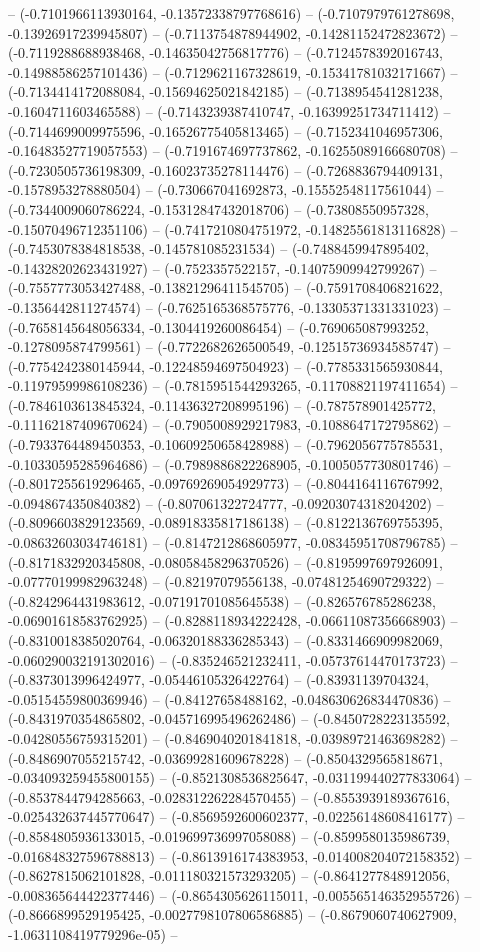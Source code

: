 -- (-0.7101966113930164, -0.13572338797768616) -- (-0.7107979761278698, -0.13926917239945807) -- (-0.7113754878944902, -0.14281152472823672) -- (-0.7119288688938468, -0.14635042756817776) -- (-0.7124578392016743, -0.14988586257101436) -- (-0.7129621167328619, -0.15341781032171667) -- (-0.7134414172088084, -0.15694625021842185) -- (-0.7138954541281238, -0.1604711603465588) -- (-0.7143239387410747, -0.16399251734711412) -- (-0.7144699009975596, -0.16526775405813465) -- (-0.7152341046957306, -0.16483527719057553) -- (-0.7191674697737862, -0.16255089166680708) -- (-0.7230505736198309, -0.16023735278114476) -- (-0.7268836794409131, -0.1578953278880504) -- (-0.730667041692873, -0.15552548117561044) -- (-0.7344009060786224, -0.15312847432018706) -- (-0.73808550957328, -0.15070496712351106) -- (-0.7417210804751972, -0.14825561813116828) -- (-0.7453078384818538, -0.145781085231534) -- (-0.7488459947895402, -0.14328202623431927) -- (-0.7523357522157, -0.14075909942799267) -- (-0.7557773053427488, -0.13821296411545705) -- (-0.7591708406821622, -0.1356442811274574) -- (-0.7625165368575776, -0.13305371331331023) -- (-0.7658145648056334, -0.1304419260086454) -- (-0.769065087993252, -0.1278095874799561) -- (-0.7722682626500549, -0.12515736934585747) -- (-0.7754242380145944, -0.12248594697504923) -- (-0.7785331565930844, -0.11979599986108236) -- (-0.7815951544293265, -0.11708821197411654) -- (-0.7846103613845324, -0.11436327208995196) -- (-0.787578901425772, -0.11162187409670624) -- (-0.7905008929217983, -0.1088647172795862) -- (-0.7933764489450353, -0.10609250658428988) -- (-0.7962056775785531, -0.10330595285964686) -- (-0.7989886822268905, -0.1005057730801746) -- (-0.8017255619296465, -0.09769269054929773) -- (-0.8044164116767992, -0.0948674350840382) -- (-0.807061322724777, -0.09203074318204202) -- (-0.8096603829123569, -0.08918335817186138) -- (-0.8122136769755395, -0.08632603034746181) -- (-0.8147212868605977, -0.08345951708796785) -- (-0.8171832920345808, -0.08058458296370526) -- (-0.8195997697926091, -0.07770199982963248) -- (-0.82197079556138, -0.07481254690729322) -- (-0.8242964431983612, -0.07191701085645538) -- (-0.826576785286238, -0.06901618583762925) -- (-0.8288118934222428, -0.06611087356668903) -- (-0.8310018385020764, -0.06320188336285343) -- (-0.8331466909982069, -0.060290032191302016) -- (-0.835246521232411, -0.05737614470173723) -- (-0.8373013996424977, -0.05446105326422764) -- (-0.83931139704324, -0.05154559800369946) -- (-0.84127658488162, -0.048630626834470836) -- (-0.8431970354865802, -0.045716995496262486) -- (-0.8450728223135592, -0.04280556759315201) -- (-0.8469040201841818, -0.03989721463698282) -- (-0.8486907055215742, -0.03699281609678228) -- (-0.8504329565818671, -0.034093259455800155) -- (-0.8521308536825647, -0.031199440277833064) -- (-0.8537844794285663, -0.028312262284570455) -- (-0.8553939189367616, -0.025432637445770647) -- (-0.8569592600602377, -0.02256148608416177) -- (-0.8584805936133015, -0.019699736997058088) -- (-0.8599580135986739, -0.016848327596788813) -- (-0.8613916174383953, -0.014008204072158352) -- (-0.8627815062101828, -0.011180321573293205) -- (-0.8641277848912056, -0.008365644422377446) -- (-0.8654305626115011, -0.005565146352955726) -- (-0.8666899529195425, -0.0027798107806586885) -- (-0.8679060740627909, -1.0631108419779296e-05) -- 